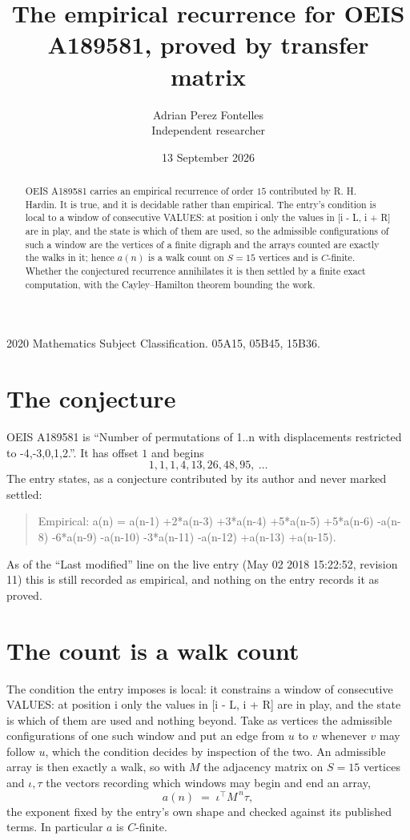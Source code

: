 \documentclass[11pt,a4paper]{article}
\title{The empirical recurrence for OEIS A189581, proved by transfer matrix}
\author{Adrian Perez Fontelles\\ \small Independent researcher}
\date{13 September 2026}
\theoremstyle{plain}
\theoremstyle{definition}
\begin{document}
\maketitle

\begin{abstract}
OEIS A189581 carries an empirical recurrence of order $15$ contributed by R. H. Hardin. It is
true, and it is decidable rather than empirical. The entry's condition is local to a window of consecutive VALUES: at position i only the values in [i - L, i + R] are in play, and the state is which of them are used, so
the admissible configurations of such a window are the vertices of a finite digraph and the
arrays counted are exactly the walks in it; hence $a(n)$ is a walk count on $S=15$ vertices
and is $C$-finite. Whether the conjectured recurrence annihilates it is then settled by a
finite exact computation, with the Cayley--Hamilton theorem bounding the work.
\end{abstract}

\noindent\small 2020 Mathematics Subject Classification. 05A15, 05B45, 15B36.\normalsize

\section{The conjecture}

OEIS A189581 is ``Number of permutations of 1..n with displacements restricted to {-4,-3,0,1,2}.''. It has offset $1$ and begins
\[
1, 1, 1, 4, 13, 26, 48, 95,\ \dots
\]
The entry states, as a conjecture contributed by its author and never marked settled:
\begin{quote}
Empirical: a(n) = a(n-1) +2*a(n-3) +3*a(n-4) +5*a(n-5) +5*a(n-6) -a(n-8) -6*a(n-9) -a(n-10) -3*a(n-11) -a(n-12) +a(n-13) +a(n-15).
\end{quote}
As of the ``Last modified'' line on the live entry (May 02 2018 15:22:52, revision 11) this is still
recorded as empirical, and nothing on the entry records it as proved.

\section{The count is a walk count}

The condition the entry imposes is local: it constrains a window of consecutive VALUES: at position i only the values in [i - L, i + R] are in play, and the state is which of them are used and nothing beyond. Take as
vertices the admissible configurations of one such window and put an edge from $u$ to $v$
whenever $v$ may follow $u$, which the condition decides by inspection of the two. An
admissible array is then exactly a walk, so with $M$ the adjacency matrix on $S=15$ vertices
and $\iota,\tau$ the vectors recording which windows may begin and end an array,
\[
a(n)\;=\;\iota^{\!\top}M^{\,n}\tau ,
\]
the exponent fixed by the entry's own shape and checked against its published terms. In
particular $a$ is $C$-finite.
\end{document}
